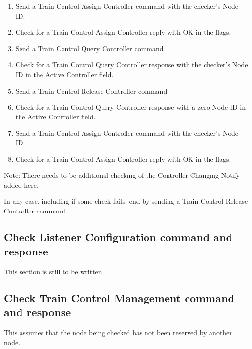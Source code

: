 \begin{enumerate}

    \item Send a Train Control Assign Controller command with the checker's Node ID.
    \item Check for a Train Control Assign Controller reply with OK in the flags.

    \item Send a Train Control Query Controller command
    \item Check for a Train Control Query Controller response with the checker's Node ID
        in the Active Controller field.

    \item Send a Train Control Release Controller command
    \item Check for a Train Control Query Controller response with a zero Node ID
        in the Active Controller field.
    
    \item Send a Train Control Assign Controller command with the checker's Node ID.
    \item Check for a Train Control Assign Controller reply with OK in the flags.

\end{enumerate}

Note:  There needs to be additional checking of the Controller Changing Notify 
    added here.

In any case, including if some check fails, end by sending a Train Control Release
    Controller command.

\subsection{Check Listener Configuration command and response}

This section is still to be written.

\subsection{Check Train Control Management command and response}

This assumes that the node being checked has not been reserved by another node.

